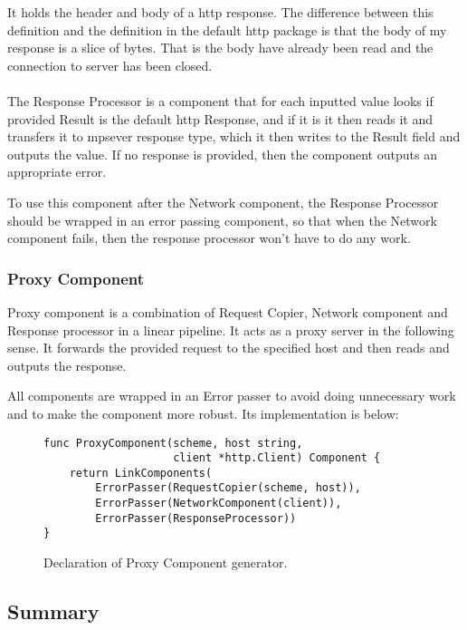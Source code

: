 \documentclass[12pt,a4paper]{article}
\begin{document}
It holds the header and body of a http response. The difference between
this definition and the definition in the default http package is that
the body of my response is a slice of bytes. That is the body have already been
read and the connection to server has been closed.
\\
\\
The Response Processor is a component that for each inputted value
looks if provided Result is the default http Response, and if it is
it then reads it and transfers it to mpsever response type, which it
then writes to the Result field and outputs the value. If no response
is provided, then the component outputs an appropriate error.

To use this component after the Network component, the Response Processor
should be wrapped in an error passing component, so that when the 
Network component fails, then the response processor won't have to do
any work.

\subsubsection{Proxy Component}
Proxy component is a combination of Request Copier, Network component 
and Response processor in a linear pipeline. It acts as a proxy server
in the following sense. It forwards the provided request to the specified
host and then reads and outputs the response. 

All components are wrapped
in an Error passer to avoid doing unnecessary work and to make the component
more robust. Its implementation is below:

\begin{figure}[h]
\centering
\begin{lstlisting}
func ProxyComponent(scheme, host string, 
					client *http.Client) Component {
	return LinkComponents(
		ErrorPasser(RequestCopier(scheme, host)),
		ErrorPasser(NetworkComponent(client)),
		ErrorPasser(ResponseProcessor))
}
\end{lstlisting}
\caption[scale=1.0]{Declaration of Proxy Component generator.}
\label{fig:ProxyComp}
\end{figure}

\subsection{Summary}

\end{document}
